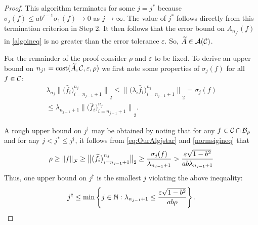 \documentclass[graybox,footinfo]{svmult}
\newcommand{\DHJRnorm}[2][{}]{\ensuremath{\left \lVert #2 \right \rVert}_{#1}}
\newcommand{\DHJRbignorm}[2][{}]{\ensuremath{\bigl \lVert #2 \bigr \rVert}_{#1}}
\begin{document}
\begin{proof}
This algorithm terminates for some $j = j^*$ because $\sigma_j(f) \le ab^{j-1} \sigma_{1}(f) \to 0$ as $j \to \infty$. The value of $j^*$ follows directly from this termination criterion in Step 2.  It then follows that the error bound on $A_{n_{j^*}}(f)$ in \eqref{algoineq} is no greater than the error tolerance $\varepsilon$.  So, $\widetilde{A} \in {\mathcal{A}}({\mathcal{C}})$.

For the remainder of the proof consider $\rho$ and $\varepsilon$ to be fixed.  To derive an upper bound on $n_{j^\dagger} = \textup{cost}(\widetilde{A},{\mathcal{C}},\varepsilon,\rho)$ we first note some properties of $\sigma_j(f)$ for all $f \in {\mathcal{C}}$:
\begin{multline} \label{normsigineq}
\lambda_{n_j} \DHJRbignorm[2]{\big( \widehat{f}_i \big)_{i=n_{j-1}+1}^{n_j}} \le 
\DHJRbignorm[2]{\big( \lambda_i \widehat{f}_i \big)_{i=n_{j-1}+1}^{n_j}} = \sigma_j(f) 
\\
\le \lambda_{n_{j-1}+1} \DHJRbignorm[2]{\big( \widehat{f}_i \big)_{i=n_{j-1}+1}^{n_j}}.
\end{multline}

A rough upper bound on $j^\dagger$ may be obtained by noting that for any $f \in {\mathcal{C}} \cap {\mathcal{B}}_\rho$ and for any $j < j^* \le j^\dagger$, it follows from \eqref{eq:OurAlgjstar} and \eqref{normsigineq} that 
\begin{equation*}
\rho \ge \DHJRnorm[\calF]{f} \ge \DHJRbignorm[2]{\big( \widehat{f}_i \big)_{i=n_{j-1}+1}^{n_j}} \ge \frac{\sigma_j(f)}{\lambda_{n_{j-1}+1}} > \frac{\varepsilon\sqrt{1 - b^2}}{ab \lambda_{n_{j-1}+1}}
\end{equation*}
Thus, one upper bound on $j^\dagger$ is the smallest $j$ violating the above inequality:
\begin{equation} \label{jdaggerlast}
j^\dagger \le \min \left \{j \in \bbN :  \lambda_{n_{j-1}+1} \le \frac{\varepsilon\sqrt{1 - b^2}}{ab \rho} \right\}.
\end{equation}


\end{proof}
\end{document}
